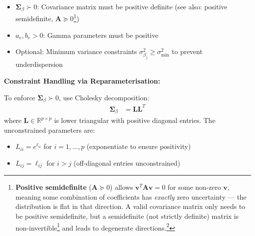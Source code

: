 \documentclass[11pt]{article}
\newcommand{\R}{\mathbb{R}}
\begin{document}
\begin{itemize}
\item $\bm{\Sigma}_\beta \succ 0$: Covariance matrix must be positive definite (see also: positive semidefinite, $\bm{A} \succeq 0$\footnote{\textbf{Positive semidefinite} ($\bm{A} \succeq 0$) allows $\bm{v}^T\bm{A}\bm{v} = 0$ for some non-zero $\bm{v}$, meaning some combination of coefficients has \emph{exactly} zero uncertainty --- the distribution is flat in that direction. A valid covariance matrix only needs to be positive semidefinite, but a semidefinite (not strictly definite) matrix is non-invertible\footnote{A matrix is \textbf{invertible} if $\bm{A}^{-1}$ exists, meaning the equation $\bm{A}\bm{x}=\bm{b}$ has a unique solution for any $\bm{b}$. Equivalently: none of the eigenvalues are zero. The precision matrix $\bm{\Sigma}_\beta^{-1}$ appears in the ELBO and CAVI updates; if $\bm{\Sigma}_\beta$ is not invertible these computations fail.} and leads to degenerate directions.\footnote{A \textbf{degenerate direction} is a direction $\bm{v}$ in which the distribution has zero spread --- the posterior is completely certain that $\bm{v}^T\bm{\beta}$ takes one exact value with no uncertainty. Geometrically: the probability ellipsoid is flat (squashed to zero thickness) along $\bm{v}$. This corresponds to a zero eigenvalue and makes the covariance matrix singular (non-invertible). It usually signals numerical collapse or that the data perfectly determines some linear combination of $\bm{\beta}$.}})
\item $a_e, b_e > 0$: Gamma parameters must be positive
\item Optional: Minimum variance constraints $\sigma^2_{\beta_j} \geq \sigma^2_{\text{min}}$ to prevent underdispersion
\end{itemize}

\textbf{Constraint Handling via Reparameterisation:}

To enforce $\bm{\Sigma}_\beta \succ 0$, use Cholesky decomposition:
\begin{align}
\bm{\Sigma}_\beta &= \bm{L}\bm{L}^T
\end{align}
where $\bm{L} \in \R^{p \times p}$ is lower triangular with positive diagonal entries. The unconstrained parameters are:
\begin{itemize}
\item $L_{ii} = e^{\ell_{ii}}$ for $i=1,\ldots,p$ (exponentiate to ensure positivity)
\item $L_{ij} = \ell_{ij}$ for $i > j$ (off-diagonal entries unconstrained)
\end{itemize}
\end{document}
